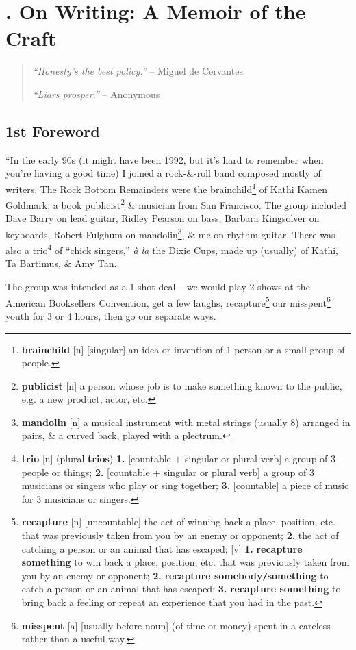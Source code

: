 \documentclass[oneside]{book}
\numberwithin{equation}{section}
\begin{document}

\chapter{\cite{King2000, King2010}. On Writing: A Memoir of the Craft}

\begin{quotation}
	\textit{``Honesty's the best policy.''} -- Miguel de Cervantes
	
	\textit{``Liars prosper.''} -- Anonymous
\end{quotation}

\section*{1st Foreword}
``In the early 90s (it might have been 1992, but it's hard to remember when you're having a good time) I joined a rock-\&-roll band composed mostly of writers. The Rock Bottom Remainders were the brainchild\footnote{\textbf{brainchild} [n] [singular] an idea or invention of 1 person or a small group of people.} of Kathi Kamen Goldmark, a book publicist\footnote{\textbf{publicist} [n] a person whose job is to make something known to the public, e.g. a new product, actor, etc.} \& musician from San Francisco. The group included Dave Barry on lead guitar, Ridley Pearson on bass, Barbara Kingsolver on keyboards, Robert Fulghum on mandolin\footnote{\textbf{mandolin} [n] a musical instrument with metal strings (usually 8) arranged in pairs, \& a curved back, played with a plectrum.}, \& me on rhythm guitar. There was also a trio\footnote{\textbf{trio} [n] (plural \textbf{trios}) \textbf{1.} [countable $+$ singular or plural verb] a group of 3 people or things; \textbf{2.} [countable $+$ singular or plural verb] a group of 3 musicians or singers who play or sing together; \textbf{3.} [countable] a piece of music for 3 musicians or singers.} of ``chick singers,'' \textit{\`a la} the Dixie Cups, made up (usually) of Kathi, Ta Bartimus, \& Amy Tan.

The group was intended as a 1-shot deal -- we would play 2 shows at the American Booksellers Convention, get a few laughs, recapture\footnote{\textbf{recapture} [n] [uncountable] the act of winning back a place, position, etc. that was previously taken from you by an enemy or opponent; \textbf{2.} the act of catching a person or an animal that has escaped; [v] \textbf{1.} \textbf{recapture something} to win back a place, position, etc. that was previously taken from you by an enemy or opponent; \textbf{2.} \textbf{recapture somebody\texttt{/}something} to catch a person or an animal that has escaped; \textbf{3.} \textbf{recapture something} to bring back a feeling or repeat an experience that you had in the past.} our misspent\footnote{\textbf{misspent} [a] [usually before noun] (of time or money) spent in a careless rather than a useful way.} youth for 3 or 4 hours, then go our separate ways.
\end{document}
